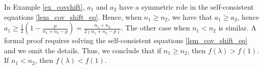 In Example \ref{ex_covshift}, $a_1$ and $a_2$ have a symmetric role in the self-consistent equations \eqref{lem_cov_shift_eq}.
Hence, when $n_1 \ge n_2$, we have that $a_1 \ge a_2$, hence $a_1 \ge \frac{1}{2}(1 - \frac{p}{n_1 + n_2 - p}) = \frac{n_1 + n_2}{2 (n_1 + n_2 - p)}$.
The other case when $n_1 < n_2$ is similar.
A formal proof requires solving the self-consistent equations \eqref{lem_cov_shift_eq} and we omit the details.
Thus, we conclude that if $n_1 \ge n_2$, then $f(\lambda) > f(1)$.
If $n_1< n_2$, then $f(\lambda)< f(1)$.





